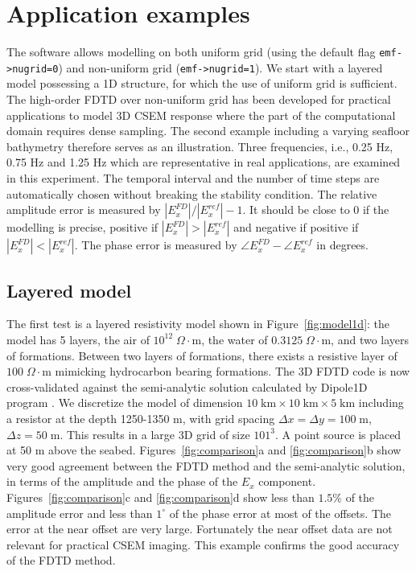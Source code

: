 \documentclass[a4paper,10pt]{article}
\begin{document}
\section{Application examples}

The software allows modelling on both uniform grid (using the default flag \verb|emf->nugrid=0|) and non-uniform grid (\verb|emf->nugrid=1|). We start with a layered model possessing a 1D structure, for which the use of uniform grid is sufficient. The high-order FDTD over non-uniform grid has been developed for practical applications to model 3D CSEM response where the part of the computational domain requires dense sampling. The second example including a varying seafloor bathymetry therefore serves as an illustration. Three frequencies, i.e., 0.25 Hz, 0.75 Hz and 1.25 Hz which are representative in real applications, are examined in this experiment. The temporal interval and the number of time steps are automatically chosen \citep{Mittet_2010_HFD} without breaking the stability condition. The relative amplitude error is measured by $|E_x^{FD}|/|E_x^{ref}|-1$. It should be close to 0 if the modelling is precise, positive if $|E_x^{FD}|>|E_x^{ref}|$ and negative if positive if $|E_x^{FD}|<|E_x^{ref}|$. The phase error is measured by $\angle E_x^{FD}-\angle E_x^{ref}$ in degrees. 


\subsection{Layered model}

The first test is a layered resistivity model shown in Figure~\ref{fig:model1d}: the model has 5 layers, the air of $10^{12} \; \Omega\cdot \mbox{m}$, the water of $0.3125 \; \Omega\cdot \mbox{m}$, and two layers of formations. Between two layers of formations, there exists a resistive layer of $100 \; \Omega\cdot \mbox{m}$ mimicking hydrocarbon bearing formations. The 3D FDTD code is now cross-validated against the semi-analytic solution calculated by Dipole1D program \citep{key20091d}. We discretize the model of dimension $10 \; \mbox{km} \times 10\; \mbox{km} \times 5 \;\mbox{km}$ including a resistor at the depth 1250-1350 m, with grid spacing $\Delta x=\Delta y=100 \; \mbox{m}$, $\Delta z=50 \; \mbox{m}$. This results in a large 3D grid of size $101^3$. A point source is placed at 50 m above the seabed.  Figures~\ref{fig:comparison}a and \ref{fig:comparison}b show very good agreement between the FDTD method and the semi-analytic solution, in terms of the amplitude and the phase of the $E_x$ component. Figures~\ref{fig:comparison}c and \ref{fig:comparison}d show less than $1.5\%$ of the amplitude error and less than $1^\circ$ of the phase error at most of the offsets. The error at the near offset are very large. Fortunately the near offset data are not relevant for practical CSEM imaging. This example confirms the good accuracy of the FDTD method.
\end{document}
